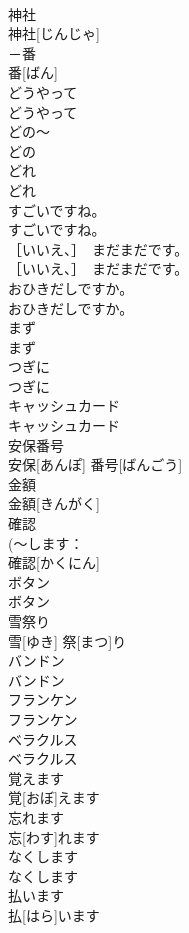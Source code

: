 \documentclass[8pt]{extreport}
\begin{document}
\begin{CJK}{UTF8}{min}
\\	神社	
\\	神社[じんじゃ]	
\\	－番	
\\	番[ばん]	
\\	どうやって	
\\	どうやって	
\\	どの～	
\\	どの~	
\\	どれ	
\\	どれ	
\\	すごいですね。	
\\	すごいですね。	
\\	［いいえ、］　まだまだです。	
\\	［いいえ、］　まだまだです。	
\\	おひきだしですか。	
\\	おひきだしですか。	
\\	まず	
\\	まず	
\\	つぎに	
\\	つぎに	
\\	キャッシュカード	
\\	キャッシュカード	
\\	安保番号	
\\	安保[あんぽ] 番号[ばんごう]	
\\	金額	
\\	金額[きんがく]	
\\	確認	
\\	(～します：
\\	確認[かくにん]	
\\	ボタン	
\\	ボタン	
\\	雪祭り	
\\	雪[ゆき] 祭[まつ]り	
\\	バンドン	
\\	バンドン	
\\	フランケン	
\\	フランケン	
\\	ベラクルス	
\\	ベラクルス	
\\	覚えます	
\\	覚[おぼ]えます	
\\	忘れます	
\\	忘[わす]れます	
\\	なくします	
\\	なくします	
\\	払います	
\\	払[はら]います	

\end{CJK}
\end{document}
